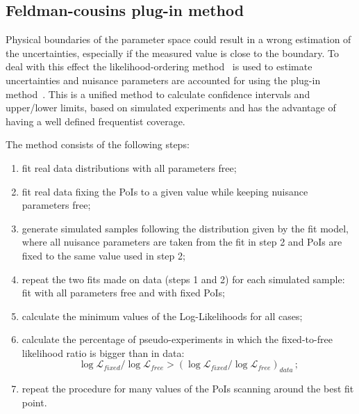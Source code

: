 \subsection{Feldman-cousins plug-in method}
\label{sec:FeldmanCousins}

Physical boundaries of the parameter space could result in a wrong estimation of the uncertainties,
especially if the measured value is close to the boundary. To deal with this effect the 
likelihood-ordering method~\cite{Feldman:1997qc} is used to estimate uncertainties and
nuisance parameters are accounted for using the plug-in method~\cite{Karbach:2011uz}. This is a unified 
method to calculate confidence intervals and upper/lower limits, based on simulated experiments and has 
the advantage of having a well defined frequentist coverage.


The method consists of the following steps:
\begin{enumerate}
\item fit real data distributions with all parameters free;
\item fit real data fixing the PoIs to a given value while keeping nuisance parameters free;
\item generate simulated samples following the distribution given by the fit model,
where all nuisance parameters are taken from the fit in step 2 and PoIs are fixed to the same value used in step 2;
\item repeat the two fits made on data (steps 1 and 2) for each simulated sample: fit with all parameters free and with fixed PoIs;
\item calculate the minimum values of the Log-Likelihoods for all cases;
\item calculate the percentage of pseudo-experiments in which the fixed-to-free likelihood ratio
is bigger than in data: 
$$\log\mathcal{L}_{fixed}/\log\mathcal{L}_{free} > (\log\mathcal{L}_{fixed}/\log\mathcal{L}_{free})_{data}\,;$$
\item repeat the procedure for many values of the PoIs scanning around the best fit point.
\end{enumerate}

